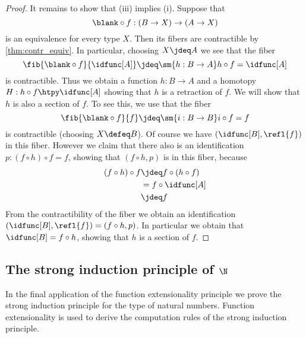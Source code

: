 \begin{proof}
It remains to show that (iii) implies (i). Suppose that
\begin{equation*}
\blank\circ f:(B\to X)\to (A\to X)
\end{equation*}
is an equivalence for every type $X$. Then its fibers are contractible by \cref{thm:contr_equiv}. In particular, choosing $X\jdeq A$ we see that the fiber
\begin{equation*}
\fib{\blank\circ f}{\idfunc[A]}\jdeq \sm{h:B\to A}h\circ f=\idfunc[A]
\end{equation*}
is contractible. Thus we obtain a function $h:B\to A$ and a homotopy $H:h\circ f\htpy\idfunc[A]$ showing that $h$ is a retraction of $f$. We will show that $h$ is also a section of $f$. To see this, we use that the fiber
\begin{equation*}
\fib{\blank\circ f}{f}\jdeq \sm{i:B\to B} i\circ f=f
\end{equation*}
is contractible (choosing $X\defeq B$). 
Of course we have $(\idfunc[B],\refl{f})$ in this fiber. However we claim that there also is an identification $p:(f\circ h)\circ f=f$, showing that $(f\circ h,p)$ is in this fiber, because
\begin{align*}
(f\circ h)\circ f & \jdeq f\circ (h\circ f) \\
& = f\circ \idfunc[A] \\
& \jdeq f
\end{align*}
From the contractibility of the fiber we obtain an identification $(\idfunc[B],\refl{f})=(f\circ h,p)$. In particular we obtain that $\idfunc[B]=f\circ h$, showing that $h$ is a section of $f$.
\end{proof}

\subsection{The strong induction principle of \texorpdfstring{$\N$}{ℕ}}

In the final application of the function extensionality principle we prove the strong induction principle for the type of natural numbers. Function extensionality is used to derive the computation rules of the strong induction principle.

